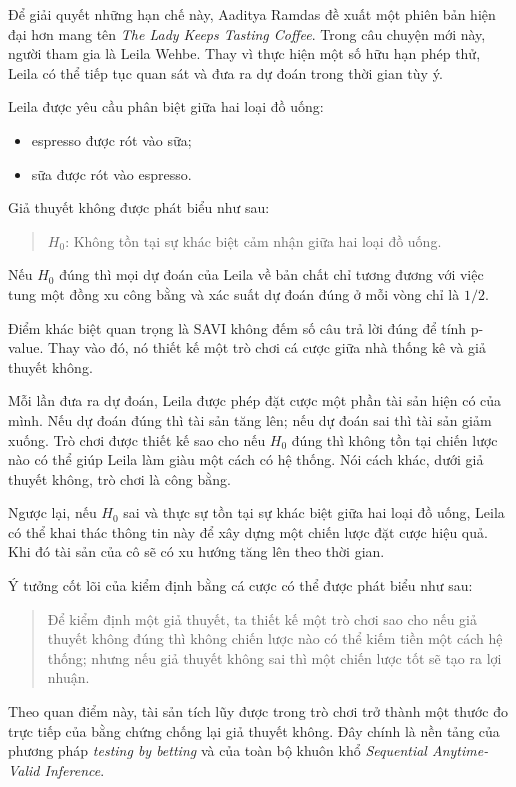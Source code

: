 Để giải quyết những hạn chế này, Aaditya Ramdas đề xuất một phiên bản hiện đại hơn mang tên \textit{The Lady Keeps Tasting Coffee}. Trong câu chuyện mới này, người tham gia là Leila Wehbe. Thay vì thực hiện một số hữu hạn phép thử, Leila có thể tiếp tục quan sát và đưa ra dự đoán trong thời gian tùy ý.

Leila được yêu cầu phân biệt giữa hai loại đồ uống:
\begin{itemize}
    \item espresso được rót vào sữa;
    \item sữa được rót vào espresso.
\end{itemize}

Giả thuyết không được phát biểu như sau:
\begin{quote}
    $H_0$: Không tồn tại sự khác biệt cảm nhận giữa hai loại đồ uống.
\end{quote}

Nếu $H_0$ đúng thì mọi dự đoán của Leila về bản chất chỉ tương đương với việc tung một đồng xu công bằng và xác suất dự đoán đúng ở mỗi vòng chỉ là $1/2$.

Điểm khác biệt quan trọng là SAVI không đếm số câu trả lời đúng để tính p-value. Thay vào đó, nó thiết kế một trò chơi cá cược giữa nhà thống kê và giả thuyết không.

Mỗi lần đưa ra dự đoán, Leila được phép đặt cược một phần tài sản hiện có của mình. Nếu dự đoán đúng thì tài sản tăng lên; nếu dự đoán sai thì tài sản giảm xuống. Trò chơi được thiết kế sao cho nếu $H_0$ đúng thì không tồn tại chiến lược nào có thể giúp Leila làm giàu một cách có hệ thống. Nói cách khác, dưới giả thuyết không, trò chơi là công bằng.

Ngược lại, nếu $H_0$ sai và thực sự tồn tại sự khác biệt giữa hai loại đồ uống, Leila có thể khai thác thông tin này để xây dựng một chiến lược đặt cược hiệu quả. Khi đó tài sản của cô sẽ có xu hướng tăng lên theo thời gian.

Ý tưởng cốt lõi của kiểm định bằng cá cược có thể được phát biểu như sau:
\begin{quote}
    Để kiểm định một giả thuyết, ta thiết kế một trò chơi sao cho nếu giả thuyết không đúng thì không chiến lược nào có thể kiếm tiền một cách hệ thống; nhưng nếu giả thuyết không sai thì một chiến lược tốt sẽ tạo ra lợi nhuận.
\end{quote}

Theo quan điểm này, tài sản tích lũy được trong trò chơi trở thành một thước đo trực tiếp của bằng chứng chống lại giả thuyết không. Đây chính là nền tảng của phương pháp \textit{testing by betting} và của toàn bộ khuôn khổ \textit{Sequential Anytime-Valid Inference}.


